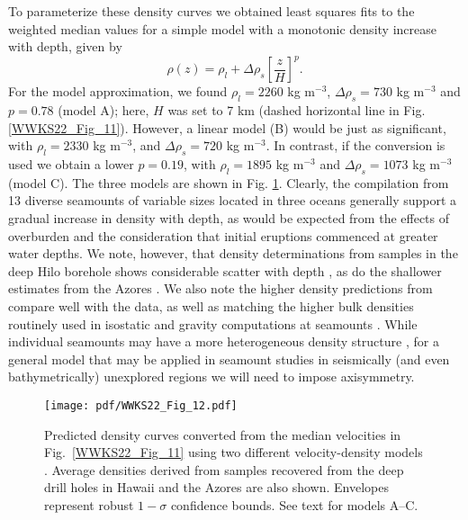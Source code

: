 To parameterize these density curves we obtained least squares fits to the weighted median values for a simple model with a
monotonic density increase with depth, given by
\begin{equation*}
\rho(z) = \rho_l + \Delta \rho_s \left [ \frac{z}{H} \right ]^p.
\end{equation*}
For the \citet{B2005} model approximation, we found $\rho_l = 2260$ kg m$^{-3}$, $\Delta \rho_s = 730$ kg m$^{-3}$ and $p = 0.78$ (model A);
here, $H$ was set to 7 km (dashed horizontal line in Fig. \ref{WWKS22_Fig_11}). However, a linear model (B) would be just as significant, with
$\rho_l = 2330$ kg m$^{-3}$, and $\Delta \rho_s = 720$ kg m$^{-3}$. In contrast, if the \citet{CR1984} conversion is used we
obtain a lower $p = 0.19$, with $\rho_l = 1895$ kg m$^{-3}$ and $\Delta \rho_s = 1073$ kg m$^{-3}$ (model C).
The three models are shown in Fig. \ref{WWKS22_Fig_12}.
Clearly, the compilation from 13 diverse seamounts of variable sizes located in three oceans generally support a gradual
increase in density with depth, as would be expected from the effects of overburden and the consideration that initial
eruptions commenced at greater water depths. We note, however, that density determinations from samples in the deep Hilo
borehole shows considerable scatter with depth \citep{JM2001}, as do the shallower estimates from the Azores \citep{H1979}.
We also note the higher density predictions from \citet{CR1984} compare well with the data, as well as matching the higher
bulk densities routinely used in isostatic and gravity computations at seamounts \citep[e.g.,~][]{WSSW06}.
While individual seamounts may have a more heterogeneous density structure \citep[e.g.,~][]{EMH05,H1991}, for a general model
that may be applied in seamount studies in seismically (and even bathymetrically) unexplored regions we will need to impose axisymmetry.

\begin{figure}
\centering
\texttt{[image: pdf/WWKS22\_Fig\_12.pdf]}
\caption{Predicted density curves converted from the median velocities in Fig.~\ref{WWKS22_Fig_11} using two different
velocity-density models \citep{B2005,CR1984}. Average densities derived from samples recovered from the deep drill holes
in Hawaii \citep{JM2001} and the Azores \citep{H1979} are also shown. Envelopes represent robust $1-\sigma$ confidence bounds. See text for models A--C.}
\label{WWKS22_Fig_12}
\end{figure}

